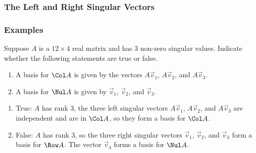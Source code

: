 \begin{frame}\frametitle{The Left and Right Singular Vectors}

    \begin{center}\end{center}
    
    \vspace{6pt}

    
\end{frame}



\begin{frame}\frametitle{Examples}

    Suppose $A$ is a $12\times4$ real matrix and has 3 non-zero singular values. Indicate whether the following statements are true or false. 
    \begin{enumerate}
        \item<2-> A basis for $\Col A$ is given by the vectors $A\vec v_1$, $A\vec v_2$, and $A\vec v_3$. 
        \item<2-> A basis for $\Nul A$ is given by $\vec v_1$, $\vec v_2$, and $\vec v_3$. 
    \end{enumerate}
    \vspace{12pt}
    \begin{enumerate}
        \item<3-> True: $A$ has rank 3, the three left singular vectors $A\vec v_1$, $A\vec v_2$, and $A\vec v_3$ are independent and are in $\Col A$, so they form a basis for $\Col A$. 
        \item<4-> False: $A$ has rank 3, so the three right singular vectors $\vec v_1$, $\vec v_2$, and $\vec v_3$ form a basis for $\Row A$. The vector $\vec v_4$ forms a basis for $\Nul A$. 
    \end{enumerate}

\end{frame}



